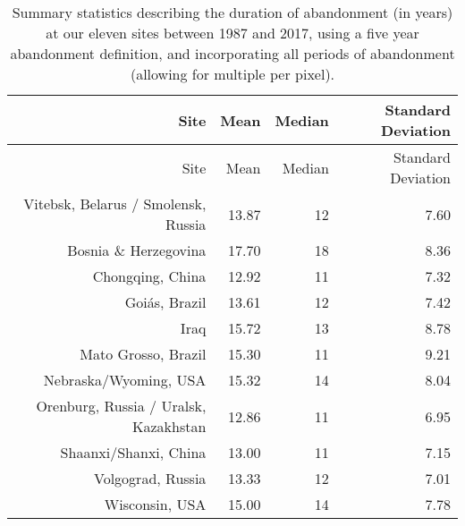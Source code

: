 \documentclass[9pt,lineno]{pnas-new}
\begin{document}
\begin{longtable}[]{@{}rrrr@{}}
\caption{\label{tab:summary-stats-table}Summary statistics describing the duration of abandonment (in years) at our eleven sites between 1987 and 2017, using a five year abandonment definition, and incorporating all periods of abandonment (allowing for multiple per pixel).}\tabularnewline
\toprule
Site & Mean & Median & Standard Deviation \\
\midrule
\endfirsthead
\toprule
Site & Mean & Median & Standard Deviation \\
\midrule
\endhead
Vitebsk, Belarus / Smolensk, Russia & 13.87 & 12 & 7.60 \\
Bosnia \& Herzegovina & 17.70 & 18 & 8.36 \\
Chongqing, China & 12.92 & 11 & 7.32 \\
Goiás, Brazil & 13.61 & 12 & 7.42 \\
Iraq & 15.72 & 13 & 8.78 \\
Mato Grosso, Brazil & 15.30 & 11 & 9.21 \\
Nebraska/Wyoming, USA & 15.32 & 14 & 8.04 \\
Orenburg, Russia / Uralsk, Kazakhstan & 12.86 & 11 & 6.95 \\
Shaanxi/Shanxi, China & 13.00 & 11 & 7.15 \\
Volgograd, Russia & 13.33 & 12 & 7.01 \\
Wisconsin, USA & 15.00 & 14 & 7.78 \\
\bottomrule
\end{longtable}
\end{document}
